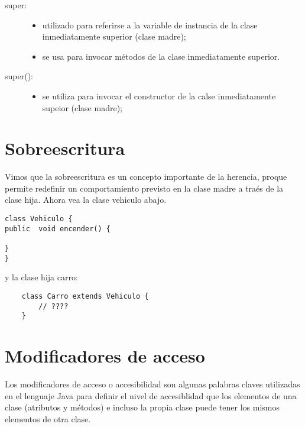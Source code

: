 \begin{description}
    \item[super: ] 
    \begin{itemize}
        \item utilizado para referirse a la variable de instancia de la clase inmediatamente superior (clase madre);
        \item se usa para invocar m\'etodos de la clase inmediatamente superior.
    \end{itemize}
    \item[super(): ] 
    \begin{itemize}
        \item se utiliza para invocar el constructor de la calse inmediatamente supeior (clase madre);
    \end{itemize}
\end{description}

\section{Sobreescritura}

Vimos que la sobreescritura es un concepto importante de la herencia, proque permite redefinir un comportamiento 
previsto en la clase madre a tra\'es de la clase hija. Ahora vea la clase vehiculo abajo.

\begin{lstlisting}
class Vehiculo {
public  void encender() {
    
}
}
\end{lstlisting}

y la clase hija carro: 

\begin{lstlisting}
    class Carro extends Vehiculo {
        // ????
    }
\end{lstlisting}

\section{Modificadores de acceso}

Los modificadores de acceso o accesibilidad son algunas palabras claves utilizadas en el lenguaje Java para definir el nivel de accesiblidad que los elementos de una clase 
(atributos y m\'etodos) e incluso la propia clase puede tener los mismos elementos de otra clase.

